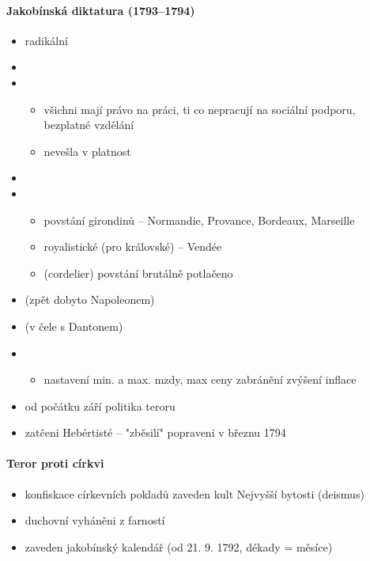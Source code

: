 \paragraph{Jakobínská diktatura (1793--1794)}
\begin{itemize}
\item radikální
\item {}
\item {}
	\begin{itemize}
	\item všichni mají právo na práci, ti co nepracují na sociální podporu, bezplatné vzdělání
	\item nevešla v platnost
	\end{itemize}
\item {}
\item {}
	\begin{itemize}
	\item povstání girondinů -- Normandie, Provance, Bordeaux, Marseille
	\item royalistické (pro královské) -- Vendée
	\item {} (cordelier) \ra povstání brutálně potlačeno
	\end{itemize}
\item {} (zpět dobyto Napoleonem)
\item {} (v čele s Dantonem)
\item {}
	\begin{itemize}
	\item nastavení min. a max. mzdy, max ceny \ra zabránění zvýšení inflace
	\end{itemize}
\item od počátku září politika teroru
\item zatčeni Hebértisté -- "zběsilí" \ra popraveni v březnu 1794
\end{itemize}

\paragraph{Teror proti církvi}
\begin{itemize}
\item konfiskace církevních pokladů
zaveden kult Nejvyšší bytosti (deismus)
\item duchovní vyháněni z farností
\item zaveden jakobínský kalendář (od 21. 9. 1792, dékady = měsíce)
\end{itemize}

